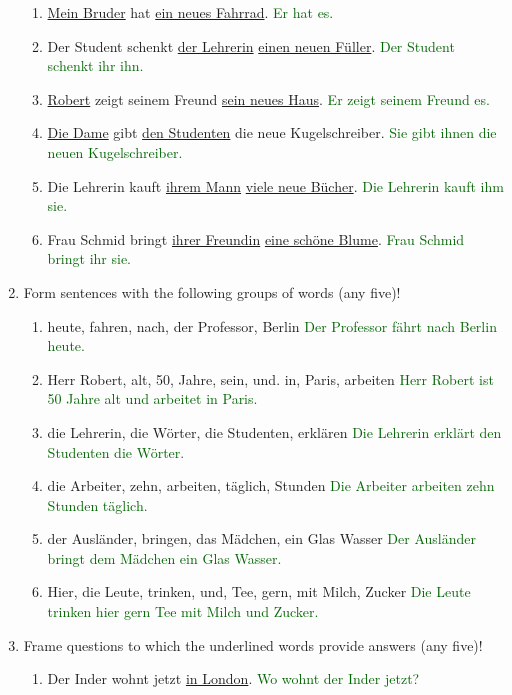 \documentclass{article}
\begin{document}
\begin{enumerate}
\begin{enumerate}
        \item \underline{Mein Bruder} hat \underline{ein neues Fahrrad}. \textcolor{darkgreen}{Er hat es.}
        \item Der Student schenkt \underline{der Lehrerin} \underline{einen neuen Füller}. \textcolor{darkgreen}{Der Student schenkt ihr ihn.}
        \item \underline{Robert} zeigt seinem Freund \underline{sein neues Haus}. \textcolor{darkgreen}{Er zeigt seinem Freund es.}
        \item \underline{Die Dame} gibt \underline{den Studenten} die neue Kugelschreiber. \textcolor{darkgreen}{Sie gibt ihnen die neuen Kugelschreiber.}
        \item Die Lehrerin kauft \underline{ihrem Mann} \underline{viele neue Bücher}. \textcolor{darkgreen}{Die Lehrerin kauft ihm sie.}
        \item Frau Schmid bringt \underline{ihrer Freundin} \underline{eine schöne Blume}. \textcolor{darkgreen}{Frau Schmid bringt ihr sie.}
    \end{enumerate}
    \item Form sentences with the following groups of words (any five)!
    \begin{enumerate}
        \item heute, fahren, nach, der Professor, Berlin \textcolor{darkgreen}{Der Professor fährt nach Berlin heute.}
        \item Herr Robert, alt, 50, Jahre, sein, und. in, Paris, arbeiten \textcolor{darkgreen}{Herr Robert ist 50 Jahre alt und arbeitet in Paris.}
        \item die Lehrerin, die Wörter, die Studenten, erklären \textcolor{darkgreen}{Die Lehrerin erklärt den Studenten die Wörter.}
        \item die Arbeiter, zehn, arbeiten, täglich, Stunden \textcolor{darkgreen}{Die Arbeiter arbeiten zehn Stunden täglich.}
        \item der Ausländer, bringen, das Mädchen, ein Glas Wasser \textcolor{darkgreen}{Der Ausländer bringt dem Mädchen ein Glas Wasser.}
        \item Hier, die Leute, trinken, und, Tee, gern, mit Milch, Zucker \textcolor{darkgreen}{Die Leute trinken hier gern Tee mit Milch und Zucker.}
    \end{enumerate}
    \item Frame questions to which the underlined words provide answers (any five)!
    \begin{enumerate} 
        \item Der Inder wohnt jetzt \underline{in London}. \textcolor{darkgreen}{Wo wohnt der Inder jetzt?}

\end{enumerate}
\end{enumerate}
\end{document}
